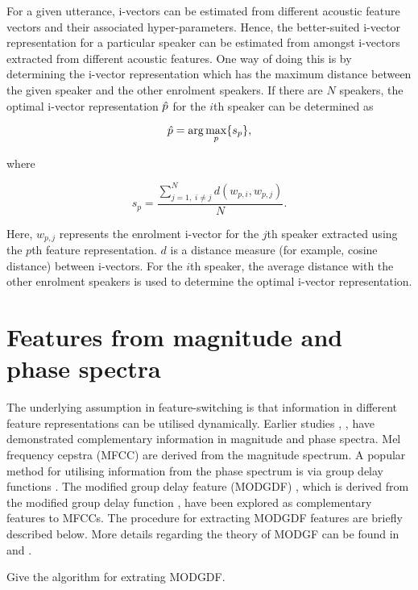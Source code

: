 \documentclass{article}
\begin{document}
For a given utterance, i-vectors can be estimated from different acoustic
feature vectors and their associated hyper-parameters. Hence, the
better-suited i-vector representation for a particular speaker can be estimated
from amongst i-vectors extracted from different acoustic features. One way of
doing this is by determining the i-vector representation which has the maximum
distance between the given speaker and the other enrolment speakers. If there
are $N$ speakers, the optimal i-vector representation $\Hat{p}$ 
for the $i$th speaker can be determined as

\begin{equation}
\Hat{p} = \arg\max_p \{s_p\},
\label{eq:p_hat}
\end{equation}

where 

\begin{equation}
s_p = \frac{\displaystyle \sum_{j=1, \; i \neq j}^N d(w_{p,i},w_{p,j})}{N}.
\label{eq:sp}
\end{equation}

Here, $w_{p,j}$ represents the enrolment i-vector for the $j$th speaker
extracted using the $p$th feature representation. $d$ is a distance measure (for
example, cosine distance) between i-vectors. For the $i$th speaker, the average
distance with the other enrolment speakers is used to determine the optimal
i-vector representation. 

\section{Features from magnitude and phase spectra}
\label{sec:featExt}

The underlying assumption in feature-switching is that information in different
feature representations can be utilised dynamically. Earlier studies \cite{1},
\cite{2}, \cite{3} have demonstrated complementary information in magnitude and
phase spectra. Mel frequency cepstra (MFCC) are derived from the magnitude
spectrum. A popular method for utilising information from the phase spectrum is
via group delay functions \cite{4}. The modified group delay feature (MODGDF)
\cite{5}, which is derived from the modified group delay function \cite{6}, have
been explored as complementary features to MFCCs. The procedure for extracting
MODGDF features are briefly described below. More details regarding the theory
of MODGF can be found in \cite{5} and \cite{6}.

Give the algorithm for extrating MODGDF.
\end{document}
